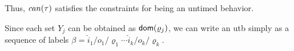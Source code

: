 Thus, $\mathit{can}({\tau})$ satisfies the constraints for being an untimed behavior.

Since each set $Y_j$ can be obtained as ${\textsf{dom}}(\varrho_j)$, we can write
an utb simply as a sequence of labels
$\beta  =  {\hat{i}_1/o_1/\varrho_1}  \cdots {\hat{i}_k/o_k/\varrho_k}$.

